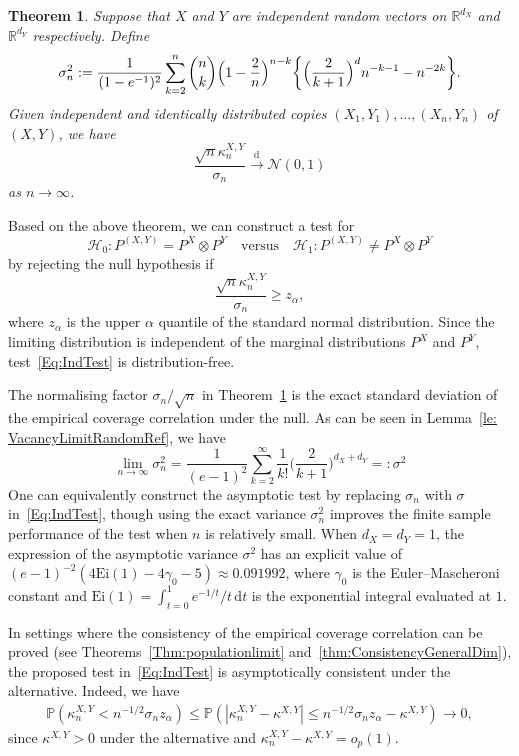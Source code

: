 \documentclass[11pt]{article}
\newtheorem{thm}{Theorem}
\newcommand{\dto}{\xrightarrow{\,\mathrm{d}\,} }
\begin{document}
\begin{thm}\label{thm: CLT}
    Suppose that $X$ and $Y$ are independent random vectors on $\mathbb{R}^{d_X}$ and $\mathbb{R}^{d_Y}$ respectively. Define
    \[
        \sigma_n^2: = \frac{1}{(1-e^{-1})^2}\sum_{k=2}^n \binom{n}{k} \Bigl(1 - \frac{2}{n}\Bigr)^{n-k}\biggl\{\Bigl(\frac{2}{k + 1}\Bigr)^d n^{-k -1} - n^{-2k}\biggr\}.
    \]
    Given independent and identically distributed copies $(X_1,Y_1),\ldots,(X_n,Y_n)$ of $(X,Y)$, we have 
    \[
        \frac{\sqrt{n} \kappa_n^{X,Y}}{\sigma_n} \dto \mathcal{N}(0, 1)
    \]
    as $n\to\infty$. 
\end{thm}
Based on the above theorem, we can construct a test for 
\[
    \mathcal{H}_0: P^{(X,Y)} = P^X\otimes P^Y \quad \text{versus} \quad \mathcal{H}_1: P^{(X,Y)}\neq P^X\otimes P^Y
\]
by rejecting the null hypothesis if 
\begin{equation}\label{Eq:IndTest}
    \frac{\sqrt{n}\kappa_n^{X,Y}}{\sigma_n} \geq z_\alpha,
\end{equation}
where $z_\alpha$ is the upper $\alpha$ quantile of the standard normal distribution. Since the limiting distribution is independent of the marginal distributions $P^X$ and $P^Y$, test~\eqref{Eq:IndTest} is distribution-free. 

The normalising factor $\sigma_n/\sqrt{n}$ in Theorem~\ref{thm: CLT} is the exact standard deviation of the empirical coverage correlation under the null. As can be seen in Lemma~\ref{le: VacancyLimitRandomRef}, we have 
\[
\lim_{n\to\infty} \sigma_n^2  = \frac{1}{(e-1)^2}\sum_{k=2}^\infty \frac{1}{k!}\biggl(\frac{2}{k+1}\biggr)^{d_X+d_Y} =:\sigma^2
\]
One can equivalently construct the asymptotic test by replacing $\sigma_n$ with $\sigma$ in~\eqref{Eq:IndTest}, though using the exact variance $\sigma_n^2$ improves the finite sample performance of the test when $n$ is relatively small. When $d_X=d_Y=1$, the expression of the asymptotic variance $\sigma^2$ has an explicit value of $(e-1)^{-2}(4\mathrm{Ei}(1)-4\gamma_0-5)\approx 0.091992$, where $\gamma_0$ is the Euler--Mascheroni constant and $\mathrm{Ei}(1)=\int_{t=0}^1e^{-1/t}/t\,\mathrm{d}t$ is the exponential integral evaluated at $1$.

In settings where the consistency of the empirical coverage correlation can be proved (see Theorems~\ref{Thm:populationlimit} and~\ref{thm:ConsistencyGeneralDim}), the proposed test in~\eqref{Eq:IndTest} is asymptotically consistent under the alternative. Indeed, we have
\begin{align*} 
\mathbb{P}(\kappa_n^{X,Y} < n^{-1/2} \sigma_n z_\alpha) \leq \mathbb{P}(|\kappa_n^{X,Y} - \kappa^{X,Y}| \leq n^{-1/2} \sigma_n z_\alpha - \kappa^{X,Y}) \to 0,
\end{align*}
since $\kappa^{X,Y} > 0$ under the alternative and $\kappa_n^{X,Y} - \kappa^{X,Y} = o_p(1)$. 
\end{document}
